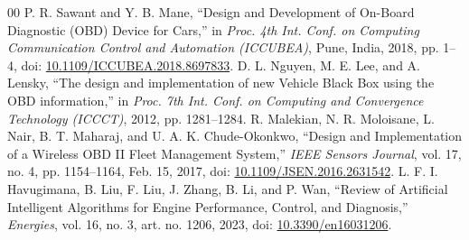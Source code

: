 \documentclass[conference]{IEEEtran}
\begin{document}
\begin{thebibliography}{00}
 P. R. Sawant and Y. B. Mane, ``Design and Development of On-Board Diagnostic (OBD) Device for Cars,'' in \textit{Proc. 4th Int. Conf. on Computing Communication Control and Automation (ICCUBEA)}, Pune, India, 2018, pp. 1--4, doi: \href{https://doi.org/10.1109/ICCUBEA.2018.8697833}{10.1109/ICCUBEA.2018.8697833}.
 D. L. Nguyen, M. E. Lee, and A. Lensky, ``The design and implementation of new Vehicle Black Box using the OBD information,'' in \textit{Proc. 7th Int. Conf. on Computing and Convergence Technology (ICCCT)}, 2012, pp. 1281--1284.
 R. Malekian, N. R. Moloisane, L. Nair, B. T. Maharaj, and U. A. K. Chude-Okonkwo, ``Design and Implementation of a Wireless OBD II Fleet Management System,'' \textit{IEEE Sensors Journal}, vol. 17, no. 4, pp. 1154--1164, Feb. 15, 2017, doi: \href{https://doi.org/10.1109/JSEN.2016.2631542}{10.1109/JSEN.2016.2631542}.
 L. F. I. Havugimana, B. Liu, F. Liu, J. Zhang, B. Li, and P. Wan, ``Review of Artificial Intelligent Algorithms for Engine Performance, Control, and Diagnosis,'' \textit{Energies}, vol. 16, no. 3, art. no. 1206, 2023, doi: \href{https://doi.org/10.3390/en16031206}{10.3390/en16031206}.

\end{thebibliography}
\end{document}
